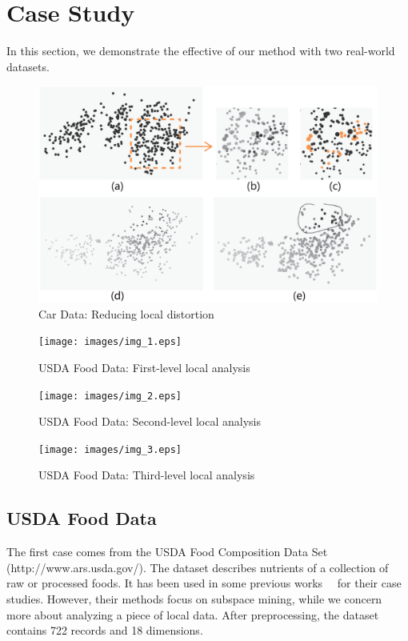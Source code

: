 \section{Case Study}
In this section, we demonstrate the effective of our method with two real-world datasets.

\begin{figure}[htbp]
\centering
  \includegraphics[width=1\linewidth]{images/case.eps}%
  \caption{Car Data: Reducing local distortion}
\label{fig:car}
  \end{figure}

\begin{figure}[htbp]
\centering
  \texttt{[image: images/img\_1.eps]}%
  \caption{USDA Food Data: First-level local analysis}
\label{fig:food1}
  \end{figure}

\begin{figure}[htbp]
\centering
  \texttt{[image: images/img\_2.eps]}%
  \caption{USDA Food Data: Second-level local analysis}
\label{fig:food2}
  \end{figure}

\begin{figure}[htbp]
\centering
  \texttt{[image: images/img\_3.eps]}%
  \caption{USDA Food Data: Third-level local analysis}
\label{fig:food3}
  \end{figure}

\subsection{USDA Food Data}
The first case comes from the USDA Food Composition Data Set (http://www.ars.usda.gov/).  The dataset describes nutrients of a collection of raw or processed foods. It has been used in some previous works~\cite{DBLP:conf/ieeevast/TatuMFBSSK12}~\cite{DBLP:journals/tvcg/YuanRWG13} for their case studies. However, their methods focus on subspace mining, while we concern more about analyzing a piece of local data. After preprocessing, the dataset contains 722 records and 18 dimensions.

